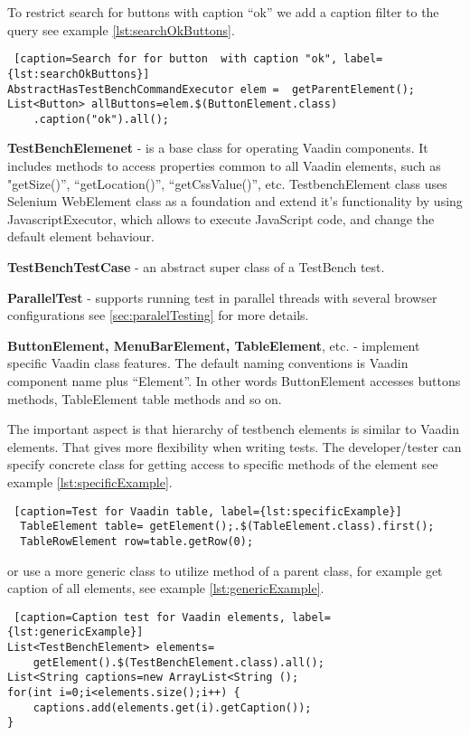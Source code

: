 To restrict search for buttons with caption ``ok'' we add a caption filter to
the query see example \ref{lst:searchOkButtons}.
  \lstset{style=a1listing}
  \begin{lstlisting} [caption=Search for for button  with caption "ok", label={lst:searchOkButtons}]
AbstractHasTestBenchCommandExecutor elem =  getParentElement();
List<Button> allButtons=elem.$(ButtonElement.class)
	.caption("ok").all();
  \end{lstlisting}
  
\textbf{TestBenchElemenet} - is a base class for operating Vaadin components. It
includes methods to access properties common to all Vaadin elements,
such as "getSize()'', ``getLocation()'', ``getCssValue()'', etc.
TestbenchElement class uses Selenium WebElement class as a foundation and extend
it's functionality by using JavascriptExecutor,
which allows to execute JavaScript code, and change the default element behaviour.

\textbf{TestBenchTestCase} - an abstract super class of a TestBench test.

\textbf{ParallelTest} - supports running test in parallel threads with several
browser configurations see \ref{sec:paralelTesting} for more details.

\textbf{ButtonElement, MenuBarElement, TableElement}, etc. - implement specific
Vaadin class features. The default naming conventions is Vaadin component name
plus ``Element''. In other words ButtonElement accesses buttons methods,
TableElement table methods and so on.

The important aspect is that hierarchy of testbench elements is similar to Vaadin elements.
That gives more flexibility when writing tests. The  developer/tester can
specify concrete class for getting access to specific methods of the element see example \ref{lst:specificExample}.
 
\lstset{style=a1listing}
\begin{lstlisting} [caption=Test for Vaadin table, label={lst:specificExample}]
  TableElement table= getElement();.$(TableElement.class).first();
  TableRowElement row=table.getRow(0);
 \end{lstlisting}
 
or use a more generic class to utilize method of a parent class, for example get
caption of all elements, see example \ref{lst:genericExample}.

\lstset{style=a1listing}
\begin{lstlisting} [caption=Caption test for Vaadin elements, label={lst:genericExample}]
List<TestBenchElement> elements=
	getElement().$(TestBenchElement.class).all();
List<String captions=new ArrayList<String ();
for(int i=0;i<elements.size();i++) {
	captions.add(elements.get(i).getCaption());
}
\end{lstlisting}

